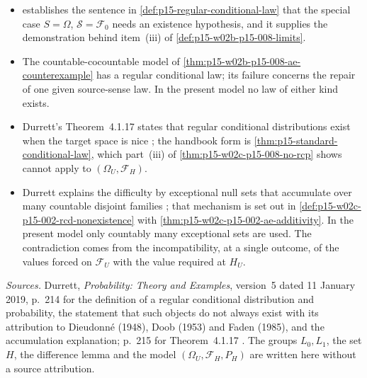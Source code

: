\begin{itemize}
\item {} establishes the sentence in
      \cref{def:p15-regular-conditional-law} that the special case
      \(S=\Omega\), \(\mathcal S=\mathcal F_0\) needs an existence
      hypothesis, and it supplies the demonstration behind item~(iii) of
      \cref{def:p15-w02b-p15-008-limits}.
\item The countable-cocountable model of
      \cref{thm:p15-w02b-p15-008-ae-counterexample} has a regular
      conditional law; its failure concerns the repair of one given
      source-sense law. In the present model no law of either kind exists.
\item Durrett's Theorem~4.1.17 states that regular conditional
      distributions exist when the target space is nice
      \cite[p.~215]{DurrettPTEAuthor2019}; the handbook form is
      \cref{thm:p15-standard-conditional-law}, which part~(iii) of
      \cref{thm:p15-w02c-p15-008-no-rcp} shows cannot apply to
      \((\Omega_U,\mathcal F_H)\).
\item Durrett explains the difficulty by exceptional null sets that
      accumulate over many countable disjoint families
      \cite[p.~214]{DurrettPTEAuthor2019}; that mechanism is set out in
      \cref{def:p15-w02c-p15-002-rcd-nonexistence} with
      \cref{thm:p15-w02c-p15-002-ae-additivity}. In the present model only
      countably many exceptional sets are used. The contradiction comes from
      the incompatibility, at a single outcome, of the values forced on
      \(\mathcal F_U\) with the value required at \(H_U\).
\end{itemize}

\emph{Sources.} Durrett, \emph{Probability: Theory and Examples},
version~5 dated 11 January 2019, p.~214 for the definition of a
regular conditional distribution and probability, the statement that such
objects do not always exist with its attribution to Dieudonn\'e (1948),
Doob (1953) and Faden (1985), and the accumulation explanation; p.~215 for
Theorem~4.1.17 \cite[pp.~214--215]{DurrettPTEAuthor2019}. The groups
\(L_0,L_1\), the set \(H\), the difference lemma and the model
\((\Omega_U,\mathcal F_H,P_H)\) are written here without a source
attribution.
